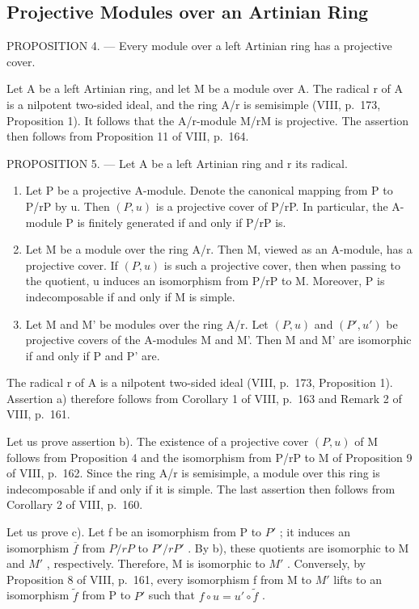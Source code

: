 \subsection{Projective Modules over an Artinian Ring}

PROPOSITION 4. --- Every module over a left Artinian ring has a projective cover.

Let A be a left Artinian ring, and let M be a module over A. The radical r of A is a nilpotent two-sided ideal, and the ring A/r is semisimple (VIII, p.~173, Proposition 1). It follows that the A/r-module M/rM is projective. The assertion then follows from Proposition 11 of VIII, p.~164.

PROPOSITION 5. --- Let A be a left Artinian ring and r its radical.

\begin{enumerate}
\def\labelenumi{\alph{enumi})}
\item
  Let P be a projective A-module. Denote the canonical mapping from P to P/rP by u. Then \((P,u)\) is a projective cover of P/rP. In particular, the A-module P is finitely generated if and only if P/rP is.
\item
  Let M be a module over the ring A/r. Then M, viewed as an A-module, has a projective cover. If \((P,u)\) is such a projective cover, then when passing to the quotient, u induces an isomorphism from P/rP to M. Moreover, P is indecomposable if and only if M is simple.
\item
  Let M and M' be modules over the ring A/r. Let \((P, u)\) and \((P', u')\) be projective covers of the A-modules M and M'. Then M and M' are isomorphic if and only if P and P' are.
\end{enumerate}

The radical r of A is a nilpotent two-sided ideal (VIII, p.~173, Proposition 1). Assertion a) therefore follows from Corollary 1 of VIII, p.~163 and Remark 2 of VIII, p.~161.

Let us prove assertion b). The existence of a projective cover \((P, u)\) of M follows from Proposition 4 and the isomorphism from P/rP to M of Proposition 9 of VIII, p.~162. Since the ring A/r is semisimple, a module over this ring is indecomposable if and only if it is simple. The last assertion then follows from Corollary 2 of VIII, p.~160.

Let us prove c). Let f be an isomorphism from P to \(P'\) ; it induces an isomorphism \(\overline{f}\) from \(P/rP\) to \(P'/rP'\) . By b), these quotients are isomorphic to M and \(M'\) , respectively. Therefore, M is isomorphic to \(M'\) . Conversely, by Proposition 8 of VIII, p.~161, every isomorphism f from M to \(M'\) lifts to an isomorphism \(\widetilde{f}\) from P to \(P'\) such that \(f \circ u = u' \circ \widetilde{f}\) .


